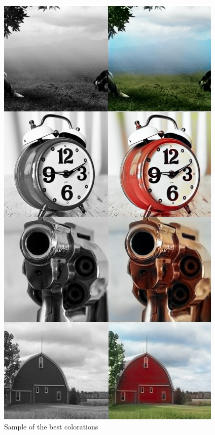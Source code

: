 \documentclass[twoside,twocolumn]{article}
\begin{document}
\begin{figure}
	\includegraphics[width=\linewidth]{img/bestimgs.png}
	\caption{Sample of the best colorations}
	\label{fig:bestimgs}
\end{figure}
\end{document}
